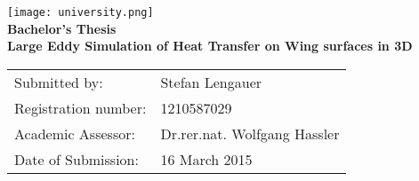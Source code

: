\begin{titlepage}
	\begin{center}

		\texttt{[image: university.png]}\\
		\vspace*{5cm}
		\LARGE
		\textbf{Bachelor's Thesis}\\
		\vspace{1.5cm}
		\Huge
		\textbf{Large Eddy Simulation of Heat Transfer on Wing surfaces in 3D}

		\vfill

		\large
		\begin{tabular}{ll}
			Submitted by:&Stefan Lengauer\\
			Registration number:&1210587029\\
			Academic Assessor:&Dr.rer.nat. Wolfgang Hassler\\
			Date of Submission:&16 March 2015\\
		\end{tabular}
	\end{center}
\end{titlepage}